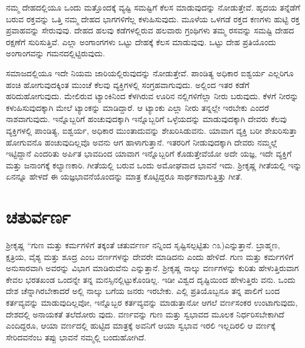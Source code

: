 ನಮ್ಮ ದೇಹದಲ್ಲಿಯೂ ಒಂದು ಮತ್ತೊಂದಕ್ಕೆ ವ್ಯಷ್ಟಿ ಸಮಷ್ಟಿಗೆ ಕೆಲಸ ಮಾಡುವುದನ್ನು ನೋಡುತ್ತೇವೆ. ಹೃದಯ ತನ್ನೆಡೆಗೆ ಬರುವ ರಕ್ತವನ್ನು ಒತ್ತಿ ನಮ್ಮ ದೇಹದ ಭಾಗಗಳಿಗೆಲ್ಲ ಕಳುಹಿಸುವುದು. ಮೂಳೆಯ ಒಳಗಡೆ ರಕ್ತದ ಕಣಗಳು ಹುಟ್ಟಿ ರಕ್ತ ಪ್ರವಾಹವನ್ನು ಸೇರುವುವು. ದೇಹದ ಹಲವು ಕಡೆಗಳಲ್ಲಿರುವ ಹಲವಾರು ಗ್ರಂಥಿಗಳು ತಮ್ಮ ರಸವನ್ನು ಸಮಷ್ಟಿ ದೇಹದ ರಕ್ಷಣೆಗೆ ಸುರಿಸುತ್ತಿವೆ. ಎಲ್ಲಾ ಅಂಗಾಂಗಗಳು ಒಟ್ಟು ದೇಹಕ್ಕೆ ಕೆಲಸ ಮಾಡುವುವು. ಒಟ್ಟು ದೇಹ ಪ್ರತಿಯೊಂದು ಅಂಗಾಂಗವನ್ನು ಗಮನದಲ್ಲಿಟ್ಟಿರುವುದು.

ಸಮಾಜದಲ್ಲಿಯೂ ಇದೇ ನಿಯಮ ಜಾರಿಯಲ್ಲಿರುವುದನ್ನು ನೋಡುತ್ತೇವೆ. ಪಾಂಡಿತ್ಯ ಅಧಿಕಾರ ಐಶ್ವರ್ಯ ಎಲ್ಲರಿಗೂ ಹಂಚಿ ಹೋಗುವುದಕ್ಕಿಂತ ಮುಂಚೆ ಕೆಲವು ವ್ಯಕ್ತಿಗಳಲ್ಲಿ ಸಂಗ್ರಹವಾಗುವುದು. ಅಲ್ಲಿಂದ ಇತರ ಕಡೆಗೆ ಹರಿದುಹೋಗುವುದು. ಮೇಲಿರುವ ಟ್ಯಾಂಕಿನಿಂದ ಕೆಳಗಿರುವ ಊರಿನ ನಲ್ಲಿಗಳಿಗೆಲ್ಲಾ ನೀರು ಬರುವುದು. ಕೆಳಗೆ ನೀರನ್ನು ಕಳುಹಿಸುವುದಕ್ಕಾಗಿ ಮೇಲೆ ಟ್ಯಾಂಕನ್ನು ಮಾಡಿದ್ದಾರೆ. ಆ ಟ್ಯಾಂಕು ಎಲ್ಲಾ ನೀರು ತನ್ನಲ್ಲೇ ಇರಬೇಕು ಎಂದರೆ ನಾಶವಾಗುವುದು. ಇನ್ನೊಬ್ಬರಿಗೆ ಹಂಚುವುದಕ್ಕಾಗಿ ಇನ್ನೊಬ್ಬರಿಗೆ ಒಳ್ಳೆಯದನ್ನು ಮಾಡುವುದಕ್ಕಾಗಿ ದೇವರು ಕೆಲವು ವ್ಯಕ್ತಿಗಳಲ್ಲಿ ಪಾಂಡಿತ್ಯ, ಐಶ್ವರ್ಯ, ಅಧಿಕಾರ ಮುಂತಾದುವನ್ನು ಶೇಖರಿಸಿಡುವನು. ಯಾವಾಗ ವ್ಯಕ್ತಿ ಬರೀ ಶೇಖರಿಸುತ್ತಾ ಹೋಗುವನೊ ಹಂಚುವುದಿಲ್ಲವೊ ಅವನು ಆಗ ಹಾಳಾಗುತ್ತಾನೆ. ಇತರರಿಗೆ ನೀಡುವುದಕ್ಕಾಗಿ ದೇವರು ನಮ್ಮಲ್ಲೆ ಇಟ್ಟಿದ್ದಾನೆ ಎಂದರಿತು ಅರ್ಪಿತ ಭಾವದಿಂದ ಯಾವಾಗ ಇನ್ನೊಬ್ಬರಿಗೆ ಕೊಡುತ್ತೇವೆಯೋ ಅದೇ ಯಜ್ಞ, ಇದೇ ವ್ಯಕ್ತಿಗೆ ಮತ್ತು ಜನಾಂಗಕ್ಕೆ ಕಲ್ಯಾಣಕಾರಿ. ಗೀತೆಯಲ್ಲಿ ಬರುವ ಒಂದು ಅಮೋಘವಾದ ಭಾವನೆ ಇದು. ಶ್ರೀಕೃಷ್ಣ ಗೀತೆಯಲ್ಲಿ ಇನ್ನು ಏನನ್ನೂ ಹೇಳದೆ ಈ ಯಜ್ಞಭಾವನೆಯೊಂದನ್ನು ಮಾತ್ರ ಕೊಟ್ಟಿದ್ದರೂ ಸಾರ್ಥಕವಾಗುತ್ತಿತ್ತು ಗೀತೆ.


\section*{ಚತುರ್ವರ್ಣ}

ಶ್ರೀಕೃಷ್ಣ “ಗುಣ ಮತ್ತು ಕರ್ಮಗಳಿಗೆ ತಕ್ಕಂತೆ ಚತುರ್ವರ್ಣ ನನ್ನಿಂದ ಸೃಷ್ಟಿಸಲ್ಪಟ್ಟಿತು ೧೩)ಎನ್ನುತ್ತಾನೆ. ಬ್ರಾಹ್ಮಣ, ಕ್ಷತ್ರಿಯ, ವೈಶ್ಯ ಮತ್ತು ಶೂದ್ರ ಎಂಬ ವರ್ಣಗಳನ್ನು ದೇವರೇ ಮಾಡಿದನು ಎಂದು ಹೇಳಿದೆ. ಗುಣ ಮತ್ತು ಕರ್ಮಗಳಿಗೆ ಅನುಸಾರವಾಗಿ ಅವರನ್ನು ವಿಭಾಗ ಮಾಡಿರುವೆನು ಎನ್ನುತ್ತಾನೆ. ಶ್ರೀಕೃಷ್ಣ ನಾಲ್ಕು ವರ್ಣಗಳನ್ನು ಕುರಿತು ಹೇಳುತ್ತಿರುವಾಗ ಕೇವಲ ಭರತಖಂಡ ಒಂದನ್ನೇ ತನ್ನ ಮನಸ್ಸಿನಲ್ಲಿಟ್ಟುಕೊಂಡಿಲ್ಲ. ಇಡೀ ವಿಶ್ವದ ದೃಷ್ಟಿಯಿಂದ ಹೇಳುತ್ತಿರು ವನು. ಒಂದು ದೇಶ ಚೆನ್ನಾಗಿರಬೇಕಾದರೆ ಅಲ್ಲಿ ನಾಲ್ಕು ಬಗೆಯ ಜನರು ಇರಬೇಕು. ಎಲ್ಲಿ ಪ್ರತಿಯೊಬ್ಬನೂ ತನ್ನ ಪಾಲಿಗೆ ಬಂದ ಕರ್ತವ್ಯವನ್ನು ಮಾಡುವುದಿಲ್ಲವೋ, ಇನ್ನೊಬ್ಬರ ಕರ್ತವ್ಯವನ್ನು ಮಾಡುತ್ತಾನೋ ಆಗಲೆ ವರ್ಣಸಂಕರ ಉಂಟಾಗುವುದು, ದೇಶದಲ್ಲಿ ಅನಾಯಕತೆ ತಲೆದೋರು ವುದು. ವರ್ಣವನ್ನು ಗುಣ ಮತ್ತು ಸ್ವಭಾವದ ಮೂಲಕ ನಿರ್ಧರಿಸಬೇಕಾಗಿದೆ ಎಂದಿದ್ದರೂ, ಆಯಾ ವರ್ಣದಲ್ಲಿ ಹುಟ್ಟಿದ ಮಾತ್ರಕ್ಕೆ ಅವನಿಗೆ ಆಯಾ ಸ್ವಭಾವ ಇರಲಿ ಇಲ್ಲದಿರಲಿ ಆ ವರ್ಣಕ್ಕೆ ಸೇರಿದವನೆಂಬ ತಪ್ಪು ಭಾವನೆ ನಮ್ಮಲ್ಲಿ ಬಂದುಹೋಗಿದೆ.


